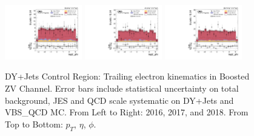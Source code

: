 \begin{figure}[!ht]
  \includegraphics[width=0.30\textwidth]{analysis_plots/2016_zv/cr_vjets_e/lep2_phi.pdf}
  \includegraphics[width=0.30\textwidth]{analysis_plots/2017_zv/cr_vjets_e/lep2_phi.pdf}
  \includegraphics[width=0.30\textwidth]{analysis_plots/2018_zv/cr_vjets_e/lep2_phi.pdf} \\
  \caption[DY+Jets Control Region: Trailing electron kinematics in Boosted ZV Channel]%
  {DY+Jets Control Region: Trailing electron kinematics in Boosted ZV Channel.
    Error bars include statistical uncertainty on total background,
    JES and QCD scale systematic on DY+Jets and VBS\_QCD MC\@. From Left to Right: 2016,
    2017, and 2018. From Top to Bottom: \( p_T \), \( \eta \), \( \phi \).}%
  \label{fig:zv-cr-vjets-e-lep2-pt-eta-phi}
\end{figure}

